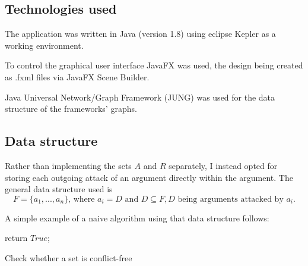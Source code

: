 \documentclass[draft,final]{vutinfth} %
\newcommand{\hl}{\par\vspace{6pt}} %
\begin{document}
\subsection{Technologies used}
The application was written in Java (version 1.8) using eclipse Kepler as a working environment.\hl
To control the graphical user interface JavaFX was used, the design being created as .fxml files via JavaFX Scene Builder.\hl
Java Universal Network/Graph Framework (JUNG) was used for the data structure of the frameworks' graphs.

\subsection{Data structure}
Rather than implementing the sets $A$ and $R$ separately, I instead opted for storing each outgoing attack of an argument directly within the argument. The general data structure used is\\
\[F=\{a_1,...,a_n\} \text{, where } a_i=D \text{ and } D\subseteq F, D \text{ being arguments attacked by } a_i.\]\hl

A simple example of a naive algorithm using that data structure follows:\hl

\begin{algorithm}[H]
 return $True$;
 \caption{Check whether a set is conflict-free}
\end{algorithm}\hl

\backmatter




\printindex

\printglossaries
\end{document}
